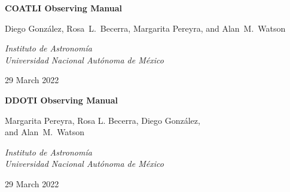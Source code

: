 
\pagestyle{empty}

\begin{centering}

\ifcoatli
\bigskip
\bigskip
\bigskip
\bigskip
{
 \Large
 \bfseries 
 COATLI Observing Manual
 \par
}
\bigskip
{
\baselineskip=10pt
 \large
 Diego González,
 Rosa~L.~Becerra,
 Margarita Pereyra,
 and
 Alan~M.~Watson
 \par
}
\bigskip
{
 \large
 \itshape 
 Instituto de Astronomía\\
 Universidad Nacional Autónoma de México
 \par
}
\bigskip
{
 \large
 29 March 2022
}
\fi

\ifddoti
\bigskip
\bigskip

{
 \Large
 \bfseries 
 DDOTI Observing Manual
 \par
}
\bigskip
\bigskip

\bigskip
\bigskip
{
\baselineskip=10pt
 \large
 Margarita Pereyra,
 Rosa L. Becerra,
 Diego González,\\
 and
 Alan~M.~Watson
 \par
}
\bigskip
{
 \large
 \itshape 
 Instituto de Astronomía\\
 Universidad Nacional Autónoma de México
 \par
}
\bigskip
{
 \large
 29 March 2022
}
\fi

\end{centering}

\newpage

\pagestyle{plain}


\tableofcontents

